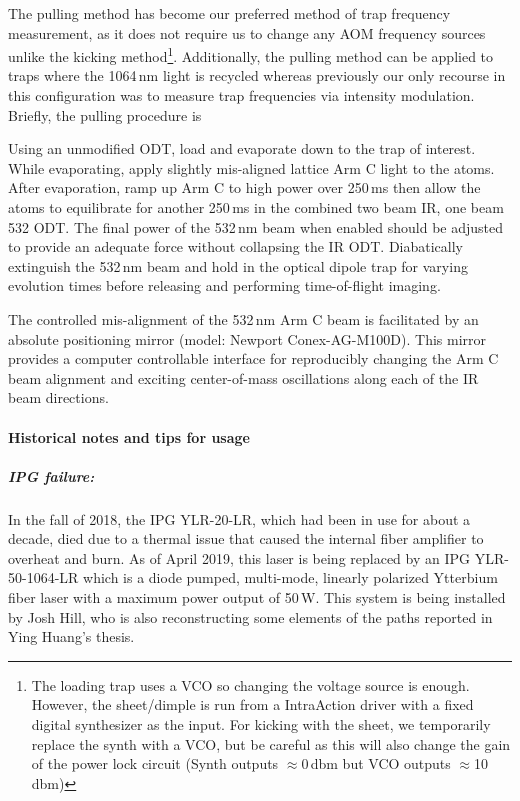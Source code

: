 The pulling method has become our preferred method of trap frequency measurement, as it does not require us to change any AOM frequency sources unlike the kicking method\footnote{The loading trap uses a VCO so changing the voltage source is enough. However, the sheet/dimple is run from a IntraAction driver with a fixed digital synthesizer as the input. For kicking with the sheet, we temporarily replace the synth with a VCO, but be careful as this will also change the gain of the power lock circuit (Synth outputs $\approx$0\,dbm but VCO outputs $\approx$10\,dbm)}.
Additionally, the pulling method can be applied to traps where the 1064\,nm light is recycled whereas previously our only recourse in this configuration was to measure trap frequencies via intensity modulation.
Briefly, the pulling procedure is 
\begin{outline}[enumerate]
	\1 Using an unmodified ODT, load and evaporate down to the trap of interest.
		\2 While evaporating, apply slightly mis-aligned lattice Arm C light to the atoms.
	\1 After evaporation, ramp up Arm C to high power over 250\,ms then allow the atoms to equilibrate for another 250\,ms in the combined two beam IR, one beam 532 ODT.
		\2 The final power of the 532\,nm beam when enabled should be adjusted to provide an adequate force without collapsing the IR ODT.
	\1 Diabatically extinguish the 532\,nm beam and hold in the optical dipole trap for varying evolution times before releasing and performing time-of-flight imaging.
\end{outline}
The controlled mis-alignment of the 532\,nm Arm C beam is facilitated by an absolute positioning mirror (model: Newport Conex-AG-M100D).
This mirror provides a computer controllable interface for reproducibly changing the Arm C beam alignment and exciting center-of-mass oscillations along each of the IR beam directions.

\paragraph{Historical notes and tips for usage}
\subparagraph{IPG failure:}
In the fall of 2018, the IPG YLR-20-LR, which had been in use for about a decade, died due to a thermal issue that caused the internal fiber amplifier to overheat and burn.
As of April 2019, this laser is being replaced by an IPG YLR-50-1064-LR which is a diode pumped, multi-mode, linearly polarized Ytterbium fiber laser with a maximum power output of 50\,W.
This system is being installed by Josh Hill, who is also reconstructing some elements of the paths reported in Ying Huang's thesis.


